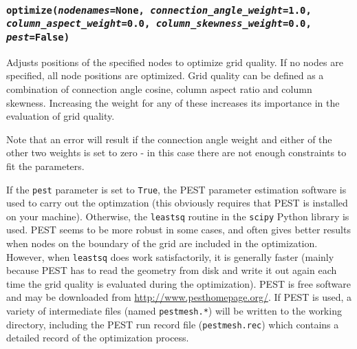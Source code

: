 \begin{snugshade}
\subsubsection{\texttt{optimize(\emph{nodenames}=None, \emph{connection\_angle\_weight}=1.0,\\
    \emph{column\_aspect\_weight}=0.0, \emph{column\_skewness\_weight}=0.0, \emph{pest}=False)}}\end{snugshade}
\label{sec:mulgrid:optimize}

Adjusts positions of the specified nodes to optimize grid quality.  If no nodes are specified, all node positions are optimized.  Grid quality can be defined as a combination of connection angle cosine, column aspect ratio and column skewness.  Increasing the weight for any of these increases its importance in the evaluation of grid quality.

Note that an error will result if the connection angle weight and either of the other two weights is set to zero - in this case there are not enough constraints to fit the parameters.

If the \texttt{pest} parameter is set to \texttt{True}, the PEST parameter estimation software is used to carry out the optimzation (this obviously requires that PEST is installed on your machine).  Otherwise, the \texttt{leastsq} routine in the \texttt{scipy} Python library is used.  PEST seems to be more robust in some cases, and often gives better results when nodes on the boundary of the grid are included in the optimization. However, when \texttt{leastsq} does work satisfactorily, it is generally faster (mainly because PEST has to read the geometry from disk and write it out again each time the grid quality is evaluated during the optimization).  PEST is free software and may be downloaded from \url{http://www.pesthomepage.org/}.  If PEST is used, a variety of intermediate files (named \texttt{pestmesh.*}) will be written to the working directory, including the PEST run record file (\texttt{pestmesh.rec}) which contains a detailed record of the optimization process.

